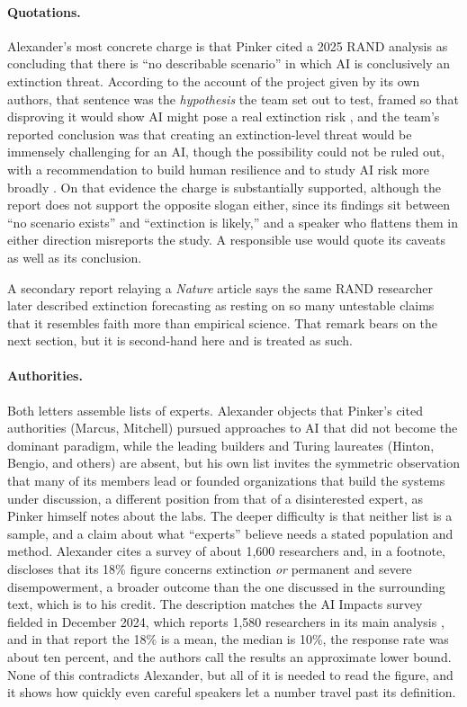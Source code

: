 \documentclass[11pt]{article}
\begin{document}
\paragraph{Quotations.} Alexander's most concrete charge is that Pinker cited a 2025 RAND analysis as concluding that there is ``no describable scenario'' in which AI is conclusively an extinction threat. According to the account of the project given by its own authors, that sentence was the \emph{hypothesis} the team set out to test, framed so that disproving it would show AI might pose a real extinction risk \cite{scientificamerican}, and the team's reported conclusion was that creating an extinction-level threat would be immensely challenging for an AI, though the possibility could not be ruled out, with a recommendation to build human resilience and to study AI risk more broadly \cite{rand2025}. On that evidence the charge is substantially supported, although the report does not support the opposite slogan either, since its findings sit between ``no scenario exists'' and ``extinction is likely,'' and a speaker who flattens them in either direction misreports the study. A responsible use would quote its caveats as well as its conclusion.

A secondary report relaying a \emph{Nature} article says the same RAND researcher later described extinction forecasting as resting on so many untestable claims that it resembles faith more than empirical science. That remark bears on the next section, but it is second-hand here and is treated as such.

\paragraph{Authorities.} Both letters assemble lists of experts. Alexander objects that Pinker's cited authorities (Marcus, Mitchell) pursued approaches to AI that did not become the dominant paradigm, while the leading builders and Turing laureates (Hinton, Bengio, and others) are absent, but his own list invites the symmetric observation that many of its members lead or founded organizations that build the systems under discussion, a different position from that of a disinterested expert, as Pinker himself notes about the labs. The deeper difficulty is that neither list is a sample, and a claim about what ``experts'' believe needs a stated population and method. Alexander cites a survey of about 1,600 researchers and, in a footnote, discloses that its 18\% figure concerns extinction \emph{or} permanent and severe disempowerment, a broader outcome than the one discussed in the surrounding text, which is to his credit. The description matches the AI Impacts survey fielded in December 2024, which reports 1,580 researchers in its main analysis \cite{aiimpacts2024}, and in that report the 18\% is a mean, the median is 10\%, the response rate was about ten percent, and the authors call the results an approximate lower bound. None of this contradicts Alexander, but all of it is needed to read the figure, and it shows how quickly even careful speakers let a number travel past its definition.
\end{document}
